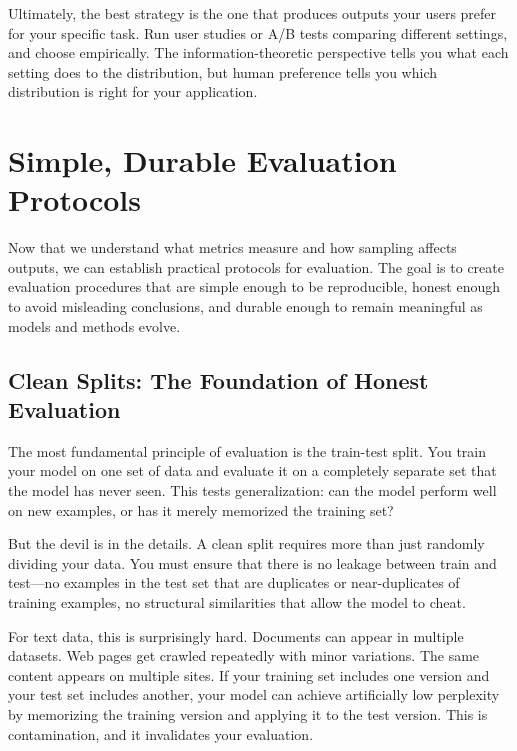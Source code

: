 Ultimately, the best strategy is the one that produces outputs your users prefer for your specific task. Run user studies or A/B tests comparing different settings, and choose empirically. The information-theoretic perspective tells you what each setting does to the distribution, but human preference tells you which distribution is right for your application.

\vspace{2em}

\section{Simple, Durable Evaluation Protocols}

Now that we understand what metrics measure and how sampling affects outputs, we can establish practical protocols for evaluation. The goal is to create evaluation procedures that are simple enough to be reproducible, honest enough to avoid misleading conclusions, and durable enough to remain meaningful as models and methods evolve.

\vspace{1em}

\subsection{Clean Splits: The Foundation of Honest Evaluation}

The most fundamental principle of evaluation is the train-test split. You train your model on one set of data and evaluate it on a completely separate set that the model has never seen. This tests generalization: can the model perform well on new examples, or has it merely memorized the training set?

\vspace{0.3cm}

But the devil is in the details. A clean split requires more than just randomly dividing your data. You must ensure that there is no leakage between train and test---no examples in the test set that are duplicates or near-duplicates of training examples, no structural similarities that allow the model to cheat.

\vspace{0.3cm}

For text data, this is surprisingly hard. Documents can appear in multiple datasets. Web pages get crawled repeatedly with minor variations. The same content appears on multiple sites. If your training set includes one version and your test set includes another, your model can achieve artificially low perplexity by memorizing the training version and applying it to the test version. This is contamination, and it invalidates your evaluation.


